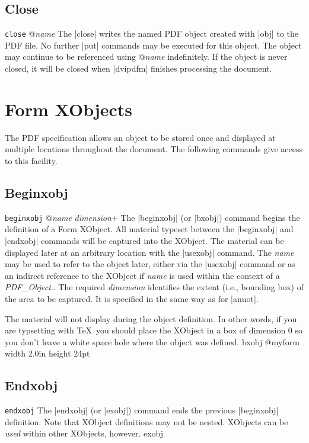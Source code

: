 {\subsection{Close}
\syntax
{\tt close} @{\it name}
\description
The |close| writes the named PDF object created with |obj| to the PDF file.
No further |put| commands may be executed for this object.
The object may continue to be referenced using @{\it name}
indefinitely.  If the object is never closed, it will
be closed when |dvipdfm| finishes processing the document.

\section{Form XObjects}

The PDF specification allows an object to be stored once
and displayed at multiple locations throughout the document.
The following commands give access to this facility.

\subsection{Beginxobj}
\syntax
{\tt beginxobj} @{\it name} {\it dimension}+
\description
The |beginxobj| (or |bxobj|) command begins the definition of
a Form XObject.  All material typeset between the
|beginxobj| and |endxobj| commands will be captured
into the XObject.  The material can be displayed later
at an arbitrary location with the |usexobj| command.
The {\it name} may be used to refer to the object later,
either via the |usexobj| command or as an indirect
reference to the XObject if {\it name} is
used within the context of a {\it PDF\_Object}..
The required {\it dimension} identifies the extent
(i.e., bounding box) of the area to be captured.
It is specified in the same way as for |annot|.

The material will not display during the object definition.
In other words, if you are typsetting with \TeX\ you
should place the XObject in a box of dimension 0 so
you don't leave a white space hole where the object was
defined.
\example
\begintt
bxobj @myform width 2.0in height 24pt
\endtt

\subsection{Endxobj}
\syntax
{\tt endxobj}
\description
The |endxobj| (or |exobj|) command ends the previous
|beginxobj| definition.  Note that XObject definitions
may not be nested.  XObjects can be {\it used} within
other XObjects, however.
\example
\begintt
exobj
\endtt

}
